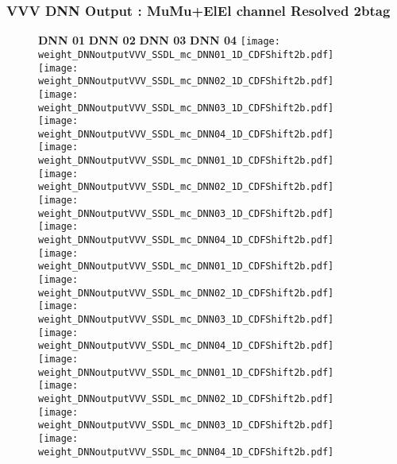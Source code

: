 \documentclass[9pt]{beamer}
\begin{document}
\begin{frame}
	\frametitle{VVV DNN Output : MuMu+ElEl channel Resolved 2btag}
	\begin{figure}
	    \textbf{DNN 01} \hspace{1.2cm} \textbf{DNN 02} \hspace{1.2cm} \textbf{DNN 03} \hspace{1.2cm} \textbf{DNN 04}
        \centering
		\texttt{[image: weight\_DNNoutputVVV\_SSDL\_mc\_DNN01\_1D\_CDFShift2b.pdf]}
		\texttt{[image: weight\_DNNoutputVVV\_SSDL\_mc\_DNN02\_1D\_CDFShift2b.pdf]}
		\texttt{[image: weight\_DNNoutputVVV\_SSDL\_mc\_DNN03\_1D\_CDFShift2b.pdf]}
		\texttt{[image: weight\_DNNoutputVVV\_SSDL\_mc\_DNN04\_1D\_CDFShift2b.pdf]}\\
		\texttt{[image: weight\_DNNoutputVVV\_SSDL\_mc\_DNN01\_1D\_CDFShift2b.pdf]}
		\texttt{[image: weight\_DNNoutputVVV\_SSDL\_mc\_DNN02\_1D\_CDFShift2b.pdf]}
		\texttt{[image: weight\_DNNoutputVVV\_SSDL\_mc\_DNN03\_1D\_CDFShift2b.pdf]}
		\texttt{[image: weight\_DNNoutputVVV\_SSDL\_mc\_DNN04\_1D\_CDFShift2b.pdf]}\\
		\texttt{[image: weight\_DNNoutputVVV\_SSDL\_mc\_DNN01\_1D\_CDFShift2b.pdf]}
		\texttt{[image: weight\_DNNoutputVVV\_SSDL\_mc\_DNN02\_1D\_CDFShift2b.pdf]}
		\texttt{[image: weight\_DNNoutputVVV\_SSDL\_mc\_DNN03\_1D\_CDFShift2b.pdf]}
		\texttt{[image: weight\_DNNoutputVVV\_SSDL\_mc\_DNN04\_1D\_CDFShift2b.pdf]}\\
		\texttt{[image: weight\_DNNoutputVVV\_SSDL\_mc\_DNN01\_1D\_CDFShift2b.pdf]}
		\texttt{[image: weight\_DNNoutputVVV\_SSDL\_mc\_DNN02\_1D\_CDFShift2b.pdf]}
		\texttt{[image: weight\_DNNoutputVVV\_SSDL\_mc\_DNN03\_1D\_CDFShift2b.pdf]}
		\texttt{[image: weight\_DNNoutputVVV\_SSDL\_mc\_DNN04\_1D\_CDFShift2b.pdf]}\\
	\end{figure}
\end{frame}
\end{document}
